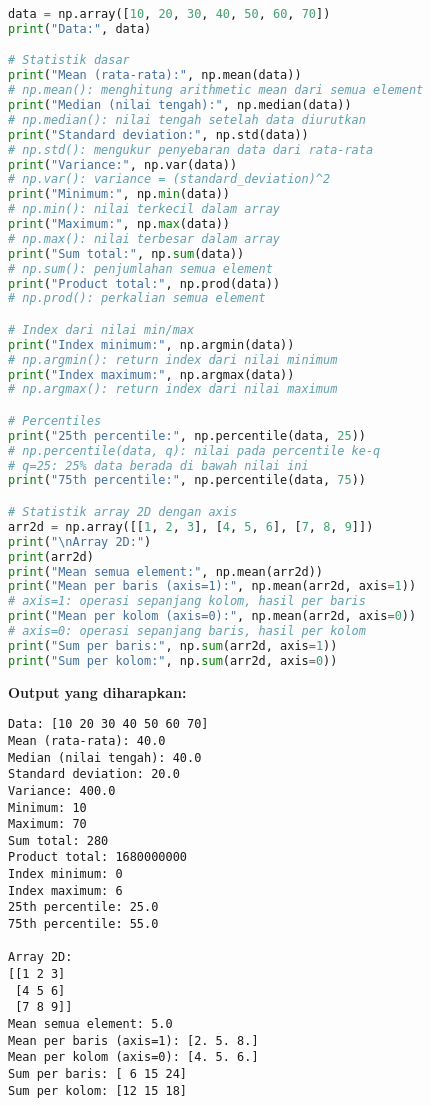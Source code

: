 \begin{lstlisting}[language=python, caption={Statistical Functions pada Array}, style=python]
data = np.array([10, 20, 30, 40, 50, 60, 70])
print("Data:", data)

# Statistik dasar
print("Mean (rata-rata):", np.mean(data))
# np.mean(): menghitung arithmetic mean dari semua element
print("Median (nilai tengah):", np.median(data))
# np.median(): nilai tengah setelah data diurutkan
print("Standard deviation:", np.std(data))
# np.std(): mengukur penyebaran data dari rata-rata
print("Variance:", np.var(data))
# np.var(): variance = (standard_deviation)^2
print("Minimum:", np.min(data))
# np.min(): nilai terkecil dalam array
print("Maximum:", np.max(data))
# np.max(): nilai terbesar dalam array
print("Sum total:", np.sum(data))
# np.sum(): penjumlahan semua element
print("Product total:", np.prod(data))
# np.prod(): perkalian semua element

# Index dari nilai min/max
print("Index minimum:", np.argmin(data))
# np.argmin(): return index dari nilai minimum
print("Index maximum:", np.argmax(data))
# np.argmax(): return index dari nilai maximum

# Percentiles
print("25th percentile:", np.percentile(data, 25))
# np.percentile(data, q): nilai pada percentile ke-q
# q=25: 25% data berada di bawah nilai ini
print("75th percentile:", np.percentile(data, 75))

# Statistik array 2D dengan axis
arr2d = np.array([[1, 2, 3], [4, 5, 6], [7, 8, 9]])
print("\nArray 2D:")
print(arr2d)
print("Mean semua element:", np.mean(arr2d))
print("Mean per baris (axis=1):", np.mean(arr2d, axis=1))
# axis=1: operasi sepanjang kolom, hasil per baris
print("Mean per kolom (axis=0):", np.mean(arr2d, axis=0))
# axis=0: operasi sepanjang baris, hasil per kolom
print("Sum per baris:", np.sum(arr2d, axis=1))
print("Sum per kolom:", np.sum(arr2d, axis=0))
\end{lstlisting}

\textbf{Output yang diharapkan:}
\begin{lstlisting}[style=bash]
Data: [10 20 30 40 50 60 70]
Mean (rata-rata): 40.0
Median (nilai tengah): 40.0
Standard deviation: 20.0
Variance: 400.0
Minimum: 10
Maximum: 70
Sum total: 280
Product total: 1680000000
Index minimum: 0
Index maximum: 6
25th percentile: 25.0
75th percentile: 55.0

Array 2D:
[[1 2 3]
 [4 5 6]
 [7 8 9]]
Mean semua element: 5.0
Mean per baris (axis=1): [2. 5. 8.]
Mean per kolom (axis=0): [4. 5. 6.]
Sum per baris: [ 6 15 24]
Sum per kolom: [12 15 18]
\end{lstlisting}

